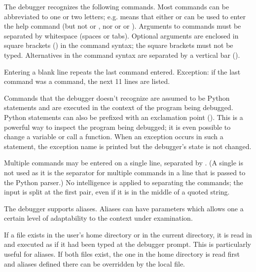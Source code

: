 The debugger recognizes the following commands.  Most commands can be
abbreviated to one or two letters; e.g.  means that
either  or  can be used to enter the help
command (but not  or , nor  or
 or ).  Arguments to commands must be
separated by whitespace (spaces or tabs).  Optional arguments are
enclosed in square brackets (\samp{[]}) in the command syntax; the
square brackets must not be typed.  Alternatives in the command syntax
are separated by a vertical bar (\samp{|}).

Entering a blank line repeats the last command entered.  Exception: if
the last command was a  command, the next 11 lines are
listed.

Commands that the debugger doesn't recognize are assumed to be Python
statements and are executed in the context of the program being
debugged.  Python statements can also be prefixed with an exclamation
point (\samp{!}).  This is a powerful way to inspect the program
being debugged; it is even possible to change a variable or call a
function.  When an
exception occurs in such a statement, the exception name is printed
but the debugger's state is not changed.

Multiple commands may be entered on a single line, separated by
\samp{;;}.  (A single \samp{;} is not used as it is
the separator for multiple commands in a line that is passed to
the Python parser.)
No intelligence is applied to separating the commands;
the input is split at the first \samp{;;} pair, even if it is in
the middle of a quoted string.

The debugger supports aliases.  Aliases can have parameters which
allows one a certain level of adaptability to the context under
examination.

If a file 
exists in the user's home directory or in the current directory, it is
read in and executed as if it had been typed at the debugger prompt.
This is particularly useful for aliases.  If both files exist, the one
in the home directory is read first and aliases defined there can be
overridden by the local file.

